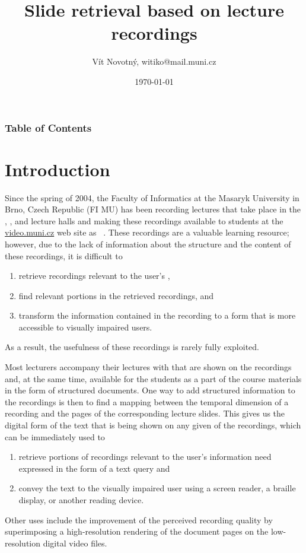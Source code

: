 \title[Lecture slide retrieval]{Slide retrieval based on lecture recordings}
\author[V.\,Novotný]{Vít Novotný, witiko@mail.muni.cz}
\date{\today}
\subject{Project report}

\maketitle

\begin{frame}
\frametitle<presentation>{Table of Contents}
\tableofcontents
\end{frame}

\section{Introduction}
Since the spring of 2004, the Faculty of Informatics at the Masaryk University
in Brno, Czech Republic (FI MU) has been recording lectures that take place in
the , , and  lecture halls and making these
recordings available to students at the
\href{https://www.video.muni.cz}{video.muni.cz} web site as ~\cite{hladkaliska03lectures}. These recordings are a valuable learning
resource; however, due to the lack of information about the structure and the
content of these recordings, it is difficult to
\begin{enumerate}
\item retrieve recordings relevant to the user's ,
\item find relevant portions in the retrieved recordings, and
\item transform the information contained in the recording to a form that is more
  accessible to visually impaired users.
\end{enumerate}
As a result, the usefulness of these recordings is rarely fully exploited.

Most lecturers accompany their lectures with  that are shown
on the recordings and, at the same time, available for the students as a part of
the course materials in the form of structured  documents. One way to
add structured information to the recordings is then to find a mapping between the
temporal dimension of a recording and the pages of the corresponding lecture
slides. This gives us the digital form of the text that is being shown on any
given  of the recordings, which can be immediately used to
\begin{enumerate}
\item retrieve portions of recordings relevant to the user's information need
  expressed in the form of a text query and
\item convey the text to the visually impaired user using a screen reader, a
  braille display, or another reading device.
\end{enumerate}
Other uses include the improvement of the perceived recording quality by
superimposing a high-resolution rendering of the  document pages on
the low-resolution digital video files.

